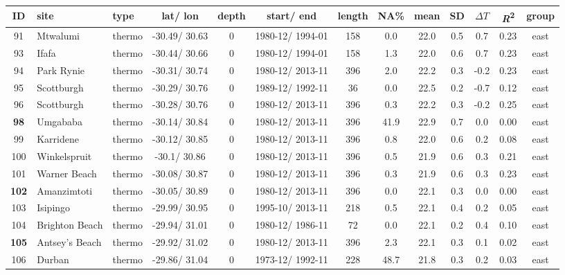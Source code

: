 \documentclass{ametsoc}
\begin{document}
\begin{table}[ht]
\label{metadata-east-table-2}
\centering
\tiny
\begin{tabular}{cllcccccccccc}
\hline
 ID & site & type & lat/ lon & depth & start/ end & length & NA\% & mean & SD & $\Delta T$ & \emph{R}\textsuperscript{2} & group \\ \hline
   91 & Mtwalumi & thermo & -30.49/ 30.63 &   0 & 1980-12/ 1994-01 & 158 & 0.0 & 22.0 & 0.5 & 0.7 & 0.23 & east \\
   93 & Ifafa & thermo & -30.44/ 30.66 &   0 & 1980-12/ 1994-01 & 158 & 1.3 & 22.0 & 0.6 & 0.7 & 0.23 & east \\
   94 & Park Rynie & thermo & -30.31/ 30.74 &   0 & 1980-12/ 2013-11 & 396 & 2.0 & 22.2 & 0.3 & -0.2 & 0.23 & east \\
   95 & Scottburgh & thermo & -30.29/ 30.76 &   0 & 1989-12/ 1992-11 &  36 & 0.0 & 22.5 & 0.2 & -0.7 & 0.12 & east \\
   96 & Scottburgh & thermo & -30.28/ 30.76 &   0 & 1980-12/ 2013-11 & 396 & 0.3 & 22.2 & 0.3 & -0.2 & 0.25 & east \\
   \textbf{98} & Umgababa & thermo & -30.14/ 30.84 &   0 & 1980-12/ 2013-11 & 396 & 41.9 & 22.9 & 0.7 & 0.0 & 0.00 & east \\
   99 & Karridene & thermo & -30.12/ 30.85 &   0 & 1980-12/ 2013-11 & 396 & 0.8 & 22.0 & 0.6 & 0.2 & 0.08 & east \\
  100 & Winkelspruit & thermo & -30.1/ 30.86 &   0 & 1980-12/ 2013-11 & 396 & 0.5 & 21.9 & 0.6 & 0.3 & 0.21 & east \\
  101 & Warner Beach & thermo & -30.08/ 30.87 &   0 & 1980-12/ 2013-11 & 396 & 0.3 & 21.9 & 0.6 & 0.3 & 0.23 & east \\
  \textbf{102} & Amanzimtoti & thermo & -30.05/ 30.89 &   0 & 1980-12/ 2013-11 & 396 & 0.0 & 22.1 & 0.3 & 0.0 & 0.00 & east \\
  103 & Isipingo & thermo & -29.99/ 30.95 &   0 & 1995-10/ 2013-11 & 218 & 0.5 & 22.1 & 0.4 & 0.2 & 0.05 & east \\
  104 & Brighton Beach & thermo & -29.94/ 31.01 &   0 & 1980-12/ 1986-11 &  72 & 0.0 & 22.1 & 0.2 & 0.4 & 0.10 & east \\
  \textbf{105} & Antsey's Beach & thermo & -29.92/ 31.02 &   0 & 1980-12/ 2013-11 & 396 & 2.3 & 22.1 & 0.3 & 0.1 & 0.02 & east \\
  106 & Durban & thermo & -29.86/ 31.04 &   0 & 1973-12/ 1992-11 & 228 & 48.7 & 21.8 & 0.3 & 0.2 & 0.03 & east \\

\end{tabular}
\end{table}
\end{document}
